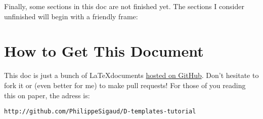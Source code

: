 
Finally, some sections in this doc are not finished yet. The sections I consider unfinished will begin with a friendly frame:


\section*{How to Get This Document}

This doc is just a bunch of \LaTeX documents \href{http://github.com/PhilippeSigaud/D-templates-tutorial}{hosted on GitHub}. Don't hesitate to fork it or (even better for me) to make pull requests! For those of you reading this on paper, the adress is:

{\color{darkblue}\texttt{http://github.com/PhilippeSigaud/D-templates-tutorial}} 

